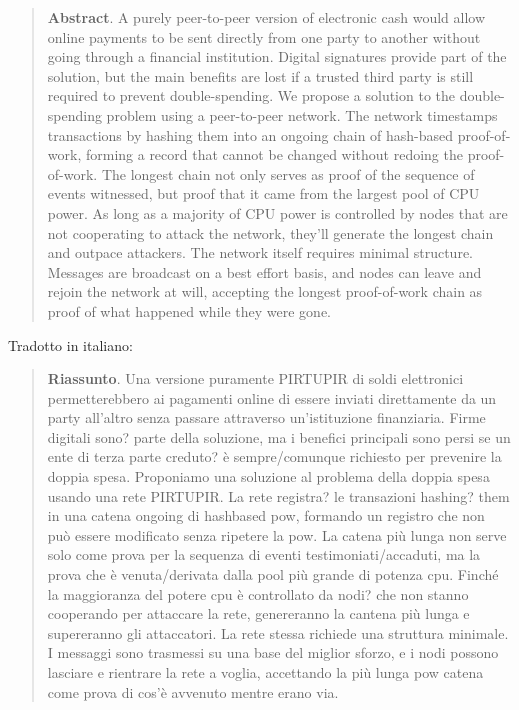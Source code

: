 \documentclass {article}
\begin{document}
\begin {quote}

\textbf {Abstract}. A purely peer-to-peer version of electronic cash would allow online payments to be sent directly from one party to another without going through a financial institution.
Digital signatures provide part of the solution, but the main benefits are lost if a trusted third party is still required to prevent double-spending.
We propose a solution to the double-spending problem using a peer-to-peer network.
The network timestamps transactions by hashing them into an ongoing chain of hash-based proof-of-work, forming a record that cannot be changed without redoing the proof-of-work.
The longest chain not only serves as proof of the sequence of events witnessed, but proof that it came from the largest pool of CPU power.
As long as a majority of CPU power is controlled by nodes that are not cooperating to attack the network, they'll generate the longest chain and outpace attackers.
The network itself requires minimal structure.
Messages are broadcast on a best effort basis, and nodes can leave and rejoin the network at will, accepting the longest proof-of-work chain as proof of what happened while they were gone.

\end {quote}

Tradotto in italiano:

\begin {quote}

\textbf {Riassunto}. Una versione puramente PIRTUPIR di soldi elettronici permetterebbero ai pagamenti online di essere inviati direttamente da un party all'altro senza passare attraverso un'istituzione finanziaria.
Firme digitali sono? parte della soluzione, ma i benefici principali sono persi se un ente di terza parte creduto? è sempre/comunque richiesto per prevenire la doppia spesa.
Proponiamo una soluzione al problema della doppia spesa usando una rete PIRTUPIR.
La rete registra? le transazioni hashing? them in una catena ongoing di hashbased pow, formando un registro che non può essere modificato senza ripetere la pow.
La catena più lunga non serve solo come prova per la sequenza di eventi testimoniati/accaduti, ma la prova che è venuta/derivata dalla pool più grande di potenza cpu. Finché la maggioranza del potere cpu è controllato da nodi? che non stanno cooperando per attaccare la rete, genereranno la cantena più lunga e supereranno gli attaccatori.
La rete stessa richiede una struttura minimale.
I messaggi sono trasmessi su una base del miglior sforzo, e i nodi possono lasciare e rientrare la rete a voglia, accettando la più lunga pow catena come prova di cos'è avvenuto mentre erano via.
\end {quote}
\end{document}
